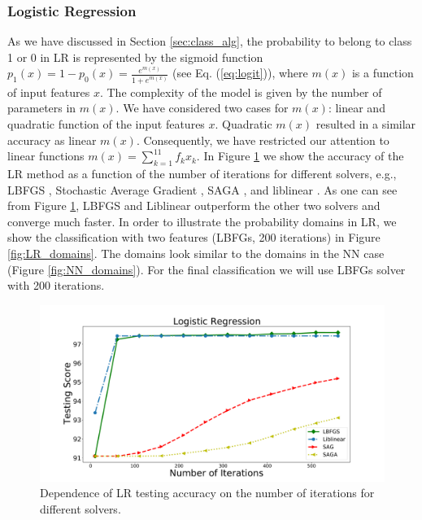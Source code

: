 \subsubsection{Logistic Regression}

As we have discussed in Section \ref{sec:class_alg}, 
the probability to belong to class 1 or 0 in LR is represented by the sigmoid function
$p_1(x) = 1 - p_0(x) = \frac{e^{m(x)}}{1 + e^{m(x)}}$ (see Eq. (\ref{eq:logit})),
where $m(x)$ is a function of input features $x$.
The complexity of the model is given by the number of parameters in $m(x)$.
We have considered two cases for $m(x)$: linear and quadratic function of the input features $x$.
Quadratic $m(x)$ resulted in a similar accuracy as linear $m(x)$.
Consequently, we have restricted our attention to linear functions $m(x) = \sum_{k = 1}^{11} f_k x_k$.
In Figure \ref{fig:LR_accuracy} we show the accuracy of the LR method as a function of the number of iterations
for different solvers, e.g., LBFGS \citep{lbfgs}, Stochastic Average Gradient \citep[SAG,][]{sag}, SAGA \citep[a variant of SAG,][]{saga},
and liblinear \citep[a special solver for LR and support vector machine classifications,][]{ll}.
As one can see from Figure \ref{fig:LR_accuracy}, LBFGS and Liblinear outperform the other two solvers and converge much faster.
In order to illustrate the probability domains in LR, we show the classification with two features (LBFGs, 200 iterations)
in Figure \ref{fig:LR_domains}. The domains look similar to the domains in the NN case (Figure \ref{fig:NN_domains}).
For the final classification we will use LBFGs solver with 200 iterations.


\begin{figure}[h]
\includegraphics[width=\twopicsp\textwidth]{plots/lr_train_assocnewfeat.pdf}
\caption{Dependence of LR testing accuracy on the number of iterations for different solvers.}
\label{fig:LR_accuracy}
\end{figure}



